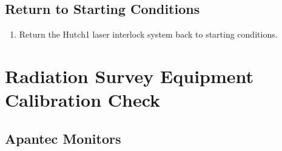 \documentclass[letterpaper,10pt,english]{sphinxmanual}
\begin{document}
\subsection{Return to Starting Conditions}
\label{\detokenize{testing_documentation/Hutch-1_laser:return-to-starting-conditions}}\begin{enumerate}
%
\item {} 
\sphinxAtStartPar
Return the Hutch\sphinxhyphen{}1 laser interlock system back to starting conditions.

\end{enumerate}

\sphinxstepscope


\section{Radiation Survey Equipment Calibration Check}
\label{\detokenize{testing_documentation/radiation_detection:radiation-survey-equipment-calibration-check}}\label{\detokenize{testing_documentation/radiation_detection::doc}}

\subsection{Apantec Monitors}
\label{\detokenize{testing_documentation/radiation_detection:apantec-monitors}}
\end{document}
